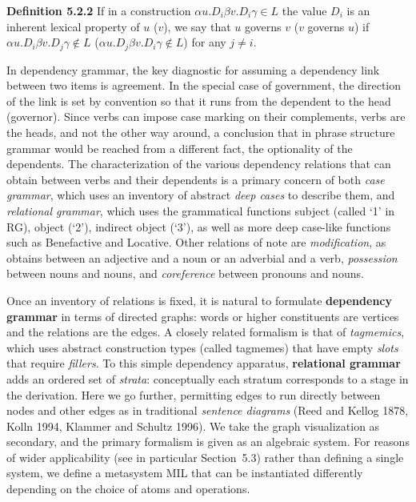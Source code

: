 \smallskip
\noindent
{\bf Definition 5.2.2} If in a construction $\alpha u.D_i \beta v.D_i \gamma
\in L$ the value $D_i$ is an inherent lexical property of $u$ ($v$), we say
that $u$ governs $v$ ($v$ governs $u$) if $\alpha u.D_i \beta v.D_j \gamma
\not\in L$ ($\alpha u.D_j \beta v.D_i \gamma \not\in L$) for any $j \neq i.$

\smallskip\noindent In dependency grammar, the key diagnostic for assuming a
dependency link between two items is agreement. In the special case of
government, the direction of the link is set by convention so that it runs
from the dependent to the head (governor). Since verbs can impose case marking
on their complements, verbs are the heads, and not the other way around, a
conclusion that in phrase structure grammar would be reached from a different
fact, the optionality of the dependents. The characterization of the various
dependency relations that can obtain between verbs and their dependents is a
primary concern of both {\it case grammar}, which uses an inventory of
abstract {\it deep cases} to describe them, and {\it relational grammar},
which uses the grammatical functions subject (called `1' in RG), object (`2'),
indirect object (`3'), as well as more deep case-like functions such as
Benefactive and Locative. Other relations of note are {\it modification}, as
obtains between an adjective and a noun or an adverbial and a verb, {\it
  possession} between nouns and nouns, and {\it coreference} between pronouns
and nouns.    

Once an inventory of relations is fixed,  it
is natural to formulate {\bf dependency grammar} in terms of directed graphs:
words or higher constituents are vertices and the relations are the edges. A
closely related formalism is that of {\it tagmemics}, which uses abstract
construction types (called tagmemes) that have empty {\it slots} that require
{\it fillers}.  To this simple dependency apparatus, {\bf
  relational grammar} adds an ordered set of {\it strata}: conceptually each
stratum corresponds to a stage in the derivation.    Here we go further, permitting edges to run
directly between nodes and other edges as in traditional {\it sentence
  diagrams} (Reed and Kellog 1878, Kolln 1994, Klammer and Schultz 1996).
 \nocite{Reed:1878} \nocite{Kolln:1994}
\nocite{Klammer:1996} We take the graph visualization as secondary, and the
primary formalism is given as an algebraic system.  For reasons of wider
applicability (see in particular Section~5.3) rather than defining a single
system, we define a metasystem MIL that can be instantiated differently
depending on the choice of atoms and operations.

